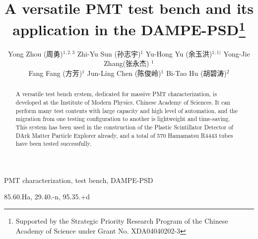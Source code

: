 \documentclass[a4paper,10pt,twoside]{cpc-hepnp}
\begin{document}





\title{A versatile PMT test bench and its application in the DAMPE-PSD\thanks{Supported by the Strategic Priority Research Program of the Chinese Academy of Science under Grant No. XDA04040202-3}}

\author{%
      Yong Zhou (周勇)$^{1,2,3}$
\quad Zhi-Yu Sun (孙志宇)$^{1}$
\quad Yu-Hong Yu (余玉洪)$^{1;1)}$
\quad Yong-Jie Zhang(张永杰) $^{1}$\\
\quad Fang Fang (方芳)$^{1}$
\quad Jun-Ling Chen (陈俊岭)$^{1}$
\quad Bi-Tao Hu (胡碧涛)$^{2}$
}
\maketitle


\address{%
$^1$ Institute of Modern Physics, Chinese Academy of Sciences,  509 Nanchang Road,  Lanzhou,  730000,  P.R.China\\
$^2$ School of Nuclear Science and Technology,  Lanzhou University,  222 South Tianshui Road,  Lanzhou,  730000,  P.R.China\\
$^3$ Graduate University of the Chinese Academy of Sciences,  19A Yuquan Road,  Beijing,  100049,  P.R.China\\
}


\begin{abstract}
A versatile test bench system, dedicated for massive PMT characterization, is developed at the Institute of Modern Physics, Chinese Academy of Sciences. 
It can perform many test contents with large capacity and high level of automation, and the migration from one testing configuration to another is lightweight and time-saving. 
This system has been used in the construction of the Plastic Scintillator Detector of DArk Matter Particle Explorer already, and a total of 570 Hamamatsu R4443 tubes have been tested successfully.
\end{abstract}


\begin{keyword}
PMT characterization, test bench, DAMPE-PSD
\end{keyword}

\begin{pacs}
85.60.Ha, 29.40.-n, 95.35.+d 
\end{pacs}
\end{document}
